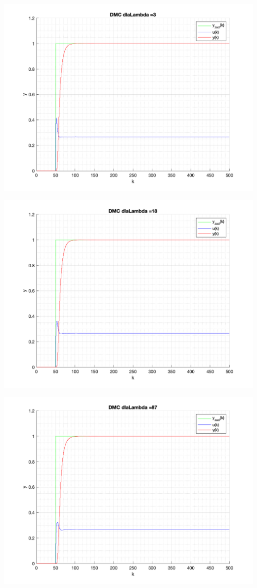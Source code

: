 \documentclass[a4paper, 11pt]{article}
\begin{document}
\begin{enumerate}
 \includegraphics[width=\linewidth]{./ModelsP4_Lambda/P4_DMC_Lambda_3_png.png} 
 
 \includegraphics[width=\linewidth]{./ModelsP4_Lambda/P4_DMC_Lambda_18_png.png} 
 
 \includegraphics[width=\linewidth]{./ModelsP4_Lambda/P4_DMC_Lambda_87_png.png} 
 

\end{enumerate}
\end{document}
